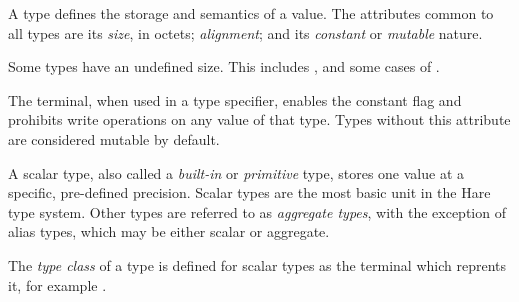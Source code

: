 
\begin{grammar}
 \\
	 \\
	 \\
	 \\
	 \\
	 \\
	 \\
	 \\
	  \\

 \\
	 \\
	 \\
	 \\
	 \\
	 \\
	 \\
	 \\
\end{grammar}

\specsubitem
A type defines the storage and semantics of a value. The attributes common to
all types are its \textit{size}, in octets; \textit{alignment}; and its
\textit{constant} or \textit{mutable} nature.

\specsubitem
Some types have an undefined size. This includes ,
and some cases of .

\specsubitem
The  terminal, when used in a type specifier, enables the
constant flag and prohibits write operations on any value of that type. Types
without this attribute are considered mutable by default.

\specsubitem
A scalar type, also called a \textit{built-in} or \textit{primitive} type,
stores one value at a specific, pre-defined precision. Scalar types are the
most basic unit in the Hare type system. Other types are referred to as
\textit{aggregate types}, with the exception of alias types, which may be
either scalar or aggregate.

\specsubitem
The \textit{type class} of a type is defined for scalar types as the terminal
which reprents it, for example .

